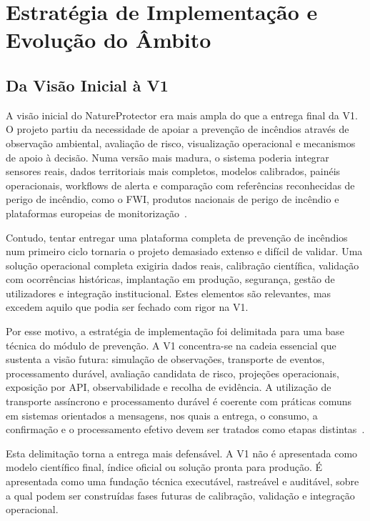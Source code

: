 \chapter{Estratégia de Implementação e Evolução do Âmbito}

\section{Da Visão Inicial à V1}

A visão inicial do NatureProtector era mais ampla do que a entrega final da V1. O projeto partiu da necessidade de apoiar a prevenção de incêndios através de observação ambiental, avaliação de risco, visualização operacional e mecanismos de apoio à decisão. Numa versão mais madura, o sistema poderia integrar sensores reais, dados territoriais mais completos, modelos calibrados, painéis operacionais, workflows de alerta e comparação com referências reconhecidas de perigo de incêndio, como o FWI, produtos nacionais de perigo de incêndio e plataformas europeias de monitorização~\citep{nrcan_fwi_system,ipma_fwi,ipma_pir_rcm,ec_jrc_effis}.

Contudo, tentar entregar uma plataforma completa de prevenção de incêndios num primeiro ciclo tornaria o projeto demasiado extenso e difícil de validar. Uma solução operacional completa exigiria dados reais, calibração científica, validação com ocorrências históricas, implantação em produção, segurança, gestão de utilizadores e integração institucional. Estes elementos são relevantes, mas excedem aquilo que podia ser fechado com rigor na V1.

Por esse motivo, a estratégia de implementação foi delimitada para uma base técnica do módulo de prevenção. A V1 concentra-se na cadeia essencial que sustenta a visão futura: simulação de observações, transporte de eventos, processamento durável, avaliação candidata de risco, projeções operacionais, exposição por API, observabilidade e recolha de evidência. A utilização de transporte assíncrono e processamento durável é coerente com práticas comuns em sistemas orientados a mensagens, nos quais a entrega, o consumo, a confirmação e o processamento efetivo devem ser tratados como etapas distintas~\citep{rabbitmq_amqp_model,rabbitmq_consumer_acknowledgements,richardson_idempotent_consumer}.

Esta delimitação torna a entrega mais defensável. A V1 não é apresentada como modelo científico final, índice oficial ou solução pronta para produção. É apresentada como uma fundação técnica executável, rastreável e auditável, sobre a qual podem ser construídas fases futuras de calibração, validação e integração operacional.

